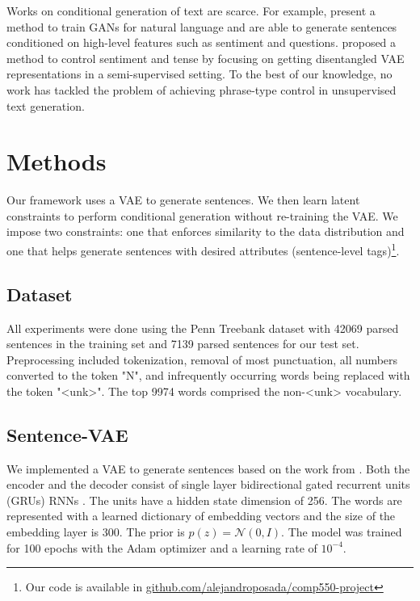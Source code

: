 \documentclass[11pt,letterpaper]{article}
\begin{document}
Works on conditional generation of text are scarce. For example, \cite{rajeswar2017adversarial} present a method to train GANs for natural language and are able to generate sentences conditioned on high-level features such as sentiment and questions. \cite{hu2017toward} proposed a method to control sentiment and tense by focusing on getting disentangled VAE representations in a semi-supervised setting. To the best of our knowledge, no work has tackled the problem of achieving phrase-type control in unsupervised text generation.

\section{Methods}
Our framework uses a VAE to generate sentences. We then learn latent constraints to perform conditional generation without re-training the VAE. We impose two constraints: one that enforces similarity to the data distribution and one that helps generate sentences with desired attributes (sentence-level tags)\footnote{Our code is available in \url{github.com/alejandroposada/comp550-project}}.

\subsection{Dataset}
All experiments were done using the Penn Treebank dataset with 42069 parsed sentences in the training set and 7139 parsed sentences for our test set. Preprocessing included tokenization, removal of most punctuation, all numbers converted to the token "N", and infrequently occurring words being replaced with the token "<unk>". The top 9974 words comprised the non-<unk> vocabulary.

\subsection{Sentence-VAE}
We implemented a VAE to generate sentences based on the work from \cite{bowman2015generating}. Both the encoder and the decoder consist of single layer bidirectional gated recurrent units (GRUs) RNNs \cite{cho2014learning}. The units have a hidden state dimension of 256. The words are represented with a learned dictionary of embedding vectors and the size of the embedding layer is 300. The prior is $p(z) = \mathcal{N}(0,I)$. The model was trained for 100 epochs with the Adam optimizer \cite{kingma2014adam} and a learning rate of $10^{-4}$. 
\end{document}
